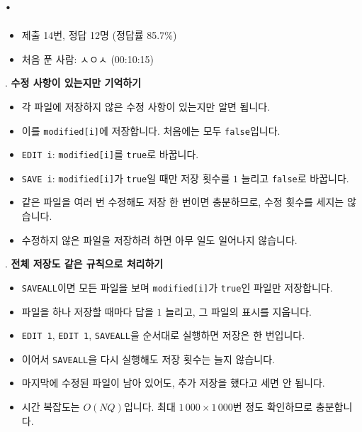 
\section{\texorpdfstring{\pletter. \ptitle}{문제 \pletter}}

\begin{frame}[label=problem-E]
    \sectiontitle{\pletter}{\ptitle}
    \begin{itemize}
        \item 제출 14번, 정답 12명 (정답률 85.7\%)
        \item 처음 푼 사람: ㅅㅇㅅ (00:10:15)
    \end{itemize}
\end{frame}

\begin{frame}{\textbf{\pletter}. \ptitle}
    \textbf{수정 사항이 있는지만 기억하기}
\begin{itemize}
        \item 각 파일에 저장하지 않은 수정 사항이 있는지만 알면 됩니다.
        \item 이를 \texttt{modified[i]}에 저장합니다. 처음에는 모두 \texttt{false}입니다.
        \item \texttt{EDIT i}: \texttt{modified[i]}를 \texttt{true}로 바꿉니다.
        \item \texttt{SAVE i}: \texttt{modified[i]}가 \texttt{true}일 때만 저장 횟수를 $1$ 늘리고 \texttt{false}로 바꿉니다.
        \item 같은 파일을 여러 번 수정해도 저장 한 번이면 충분하므로, 수정 횟수를 세지는 않습니다.
        \item 수정하지 않은 파일을 저장하려 하면 아무 일도 일어나지 않습니다.
    \end{itemize}
\end{frame}

\begin{frame}{\textbf{\pletter}. \ptitle}
    \textbf{전체 저장도 같은 규칙으로 처리하기}
\begin{itemize}
        \item \texttt{SAVEALL}이면 모든 파일을 보며 \texttt{modified[i]}가 \texttt{true}인 파일만 저장합니다.
        \item 파일을 하나 저장할 때마다 답을 $1$ 늘리고, 그 파일의 표시를 지웁니다.
        \item \texttt{EDIT 1}, \texttt{EDIT 1}, \texttt{SAVEALL}을 순서대로 실행하면 저장은 한 번입니다.
        \item 이어서 \texttt{SAVEALL}을 다시 실행해도 저장 횟수는 늘지 않습니다.
        \item 마지막에 수정된 파일이 남아 있어도, 추가 저장을 했다고 세면 안 됩니다.
        \item 시간 복잡도는 $O(NQ)$입니다. 최대 $1\,000\times1\,000$번 정도 확인하므로 충분합니다.
    \end{itemize}
\end{frame}
